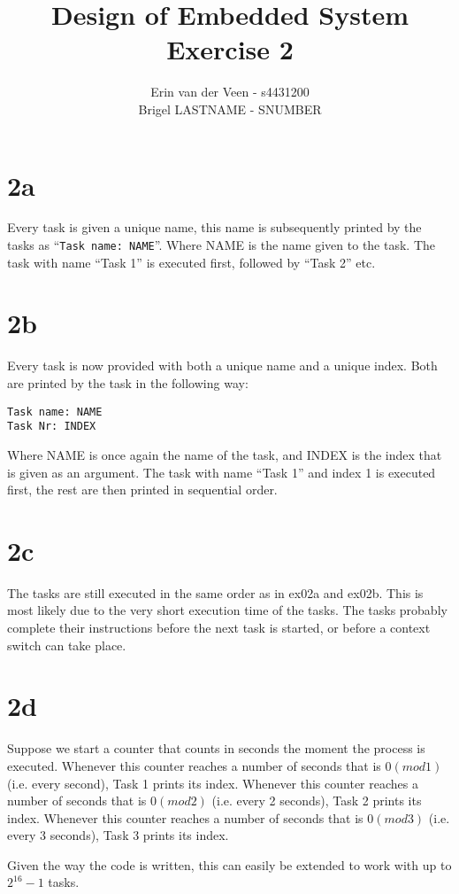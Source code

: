 \documentclass{scrartcl}
\title{Design of Embedded System\\Exercise 2}
\author{Erin van der Veen - s4431200\\
	Brigel LASTNAME - SNUMBER}
\begin{document}
\maketitle

\section*{2a}
Every task is given a unique name, this name is subsequently printed by the tasks as ``\lstinline|Task name: NAME|''.
Where NAME is the name given to the task.
The task with name ``Task 1'' is executed first, followed by ``Task 2'' etc.

\section*{2b}
Every task is now provided with both a unique name and a unique index.
Both are printed by the task in the following way:
\begin{lstlisting}
Task name: NAME
Task Nr: INDEX
\end{lstlisting}
Where NAME is once again the name of the task, and INDEX is the index that is given as an argument.
The task with name ``Task 1'' and index 1 is executed first, the rest are then printed in sequential order.

\section*{2c}
The tasks are still executed in the same order as in ex02a and ex02b.
This is most likely due to the very short execution time of the tasks.
The tasks probably complete their instructions before the next task is started, or before a context switch can take place.

\section*{2d}
Suppose we start a counter that counts in seconds the moment the process is executed.
Whenever this counter reaches a number of seconds that is $0 (mod 1)$ (i.e. every second), Task 1 prints its index.
Whenever this counter reaches a number of seconds that is $0 (mod 2)$ (i.e. every 2 seconds), Task 2 prints its index.
Whenever this counter reaches a number of seconds that is $0 (mod 3)$ (i.e. every 3 seconds), Task 3 prints its index.

Given the way the code is written, this can easily be extended to work with up to $2^16 - 1$ tasks.
\end{document}
